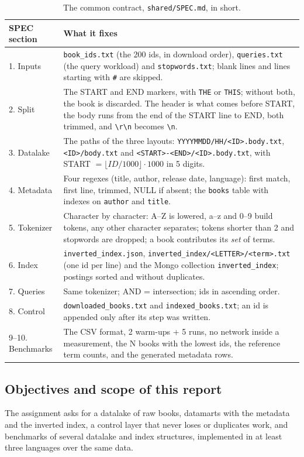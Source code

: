 \documentclass[11pt,a4paper]{article}
\newcommand{\code}[1]{\texttt{#1}}
\begin{document}
\begin{table}[H]
\centering\small
\begin{tabularx}{\linewidth}{@{}l Y@{}}
\toprule
SPEC section & What it fixes \\
. Inputs & \code{book\_ids.txt} (the 200 ids, in download order), \code{queries.txt} (the query workload) and \code{stopwords.txt}; blank lines and lines starting with \code{\#} are skipped. \\
2. Split & The START and END markers, with \code{THE} or \code{THIS}; without both, the book is discarded. The header is what comes before START, the body runs from the end of the START line to END, both trimmed, and \code{\textbackslash r\textbackslash n} becomes \code{\textbackslash n}. \\
3. Datalake & The paths of the three layouts: \code{YYYYMMDD/HH/<ID>.body.txt}, \code{<ID>/body.txt} and \code{<START>-<END>/<ID>.body.txt}, with START $= \lfloor ID/1000\rfloor\cdot 1000$ in 5 digits. \\
4. Metadata & Four regexes (title, author, release date, language): first match, first line, trimmed, NULL if absent; the \code{books} table with indexes on \code{author} and \code{title}. \\
5. Tokenizer & Character by character: A--Z is lowered, a--z and 0--9 build tokens, any other character separates; tokens shorter than 2 and stopwords are dropped; a book contributes its \emph{set} of terms. \\
6. Index & \code{inverted\_index.json}, \code{inverted\_index/<LETTER>/<term>.txt} (one id per line) and the Mongo collection \code{inverted\_index}; postings sorted and without duplicates. \\
7. Queries & Same tokenizer; AND = intersection; ids in ascending order. \\
8. Control & \code{downloaded\_books.txt} and \code{indexed\_books.txt}; an id is appended only after its step was written. \\
9--10. Benchmarks & The CSV format, 2 warm-ups + 5 runs, no network inside a measurement, the N books with the lowest ids, the reference term counts, and the generated metadata rows. \\
\bottomrule
\end{tabularx}
\caption{The common contract, \code{shared/SPEC.md}, in short.}
\end{table}

\subsection{Objectives and scope of this report}
The assignment asks for a datalake of raw books, datamarts with the metadata and the inverted
index, a control layer that never loses or duplicates work, and benchmarks of several datalake and
index structures, implemented in at least three languages over the same data.
\end{document}

